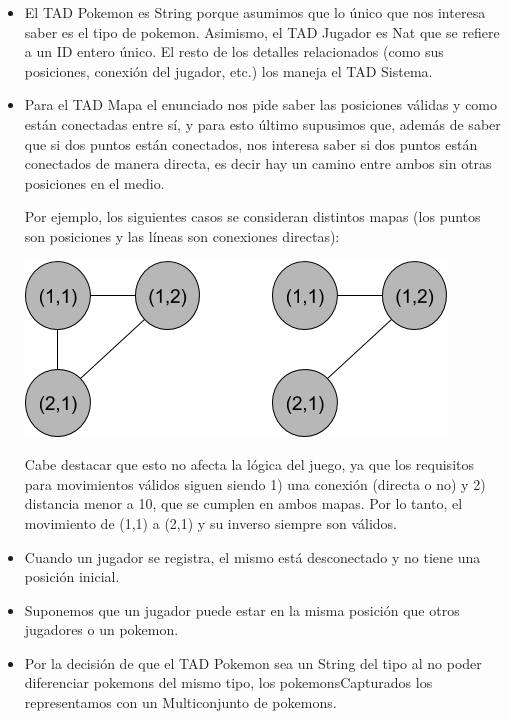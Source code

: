 \renewcommand{\labelitemi}{\textbullet}
\begin{itemize}

\item El TAD Pokemon es String porque asumimos que lo \'unico que nos interesa saber es el tipo de pokemon. Asimismo, el TAD Jugador es Nat que se refiere a un ID entero \'unico. El resto de los detalles relacionados (como sus posiciones, conexi\'on del jugador, etc.) los maneja el TAD Sistema.

\item Para el TAD Mapa el enunciado nos pide saber las posiciones v\'alidas y como est\'an conectadas entre s\'i, y para esto \'ultimo supusimos que, adem\'as de saber que si dos puntos est\'an conectados, nos interesa saber si dos puntos est\'an conectados de manera directa, es decir hay un camino entre ambos sin otras posiciones en el medio.

Por ejemplo, los siguientes casos se consideran distintos mapas (los puntos son posiciones y las l\'ineas son conexiones directas):

\bigskip
\centerline{\includegraphics[scale=0.5]{nodos-mapa.png}}

Cabe destacar que esto no afecta la l\'ogica del juego, ya que los requisitos para movimientos v\'alidos siguen siendo 1) una conexi\'on (directa o no) y 2) distancia menor a 10, que se cumplen en ambos mapas. Por lo tanto, el movimiento de (1,1) a (2,1) y su inverso siempre son v\'alidos.

\item Cuando un jugador se registra, el mismo est\'a desconectado y no tiene una posici\'on inicial.

\item Suponemos que un jugador puede estar en la misma posici\'on que otros jugadores o un pokemon.

\item Por la decisi\'on de que el TAD Pokemon sea un String del tipo al no poder diferenciar pokemons del mismo tipo, los pokemonsCapturados los representamos con un Multiconjunto de pokemons.


\end{itemize}
